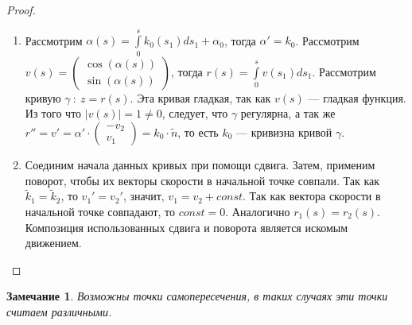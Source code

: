 \documentclass[12pt]{article}
\newcommand\tab[1][.5cm]{\hspace*{#1}}
\theoremstyle{plain}
\newtheorem{remark}{Замечание}
\begin{document}
    \begin{proof}\tab
        \begin{enumerate}
            \item Рассмотрим $\alpha(s)=\int\limits_0^sk_0(s_1)ds_1+\alpha_0$, тогда $\alpha'=k_0$. Рассмотрим $v(s)=\begin{pmatrix}
                \cos(\alpha(s))\\
                \sin(\alpha(s))
            \end{pmatrix}$, тогда $r(s)=\int\limits_0^sv(s_1)ds_1$. Рассмотрим кривую $\gamma \ : \ z=r(s)$. Эта кривая гладкая, так как $v(s)$ --- гладкая функция. Из того что $|v(s)|=1\neq 0$, следует, что $\gamma$ регулярна, а так же $r''=v'=\alpha'\cdot\begin{pmatrix}
                -v_2\\
                v_1
            \end{pmatrix}=k_0\cdot\tilde{n}$, то есть $k_0$ --- кривизна кривой $\gamma$.
            \item Соединим начала данных кривых при помощи сдвига. Затем, применим поворот, чтобы их векторы скорости в начальной точке совпали. Так как $\tilde{k}_1=\tilde{k}_2$, то $v_1'=v_2'$, значит, $v_1=v_2+const$. Так как вектора скорости в начальной точке совпадают, то $const=0$. Аналогично $r_1(s)=r_2(s)$. Композиция использованных сдвига и поворота является искомым движением.
        \end{enumerate}
    \end{proof}
    \begin{remark}
        Возможны точки самопересечения, в таких случаях эти точки считаем различными.
    \end{remark}
\end{document}
